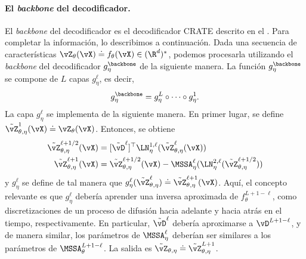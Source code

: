 \documentclass[../../book-main_es.tex]{subfiles}
\begin{document}
\paragraph{El \textit{backbone} del decodificador.} El \textit{backbone} del decodificador es el decodificador CRATE
descrito en el . Para completar la información,
lo describimos a continuación. Dada una secuencia de características \(\vZ_{\theta}(\vX) \doteq
f_{\theta}(\vX) \in (\R^{d})^{*}\), podemos procesarla utilizando el
\textit{backbone} del decodificador \(g_{\eta}^{\backbone}\) de la siguiente manera. La función
\(g_{\eta}^{\backbone}\) se compone de \(L\) capas \(g_{\eta}^{\ell}\), es decir,
\begin{equation}
g_{\eta}^{\backbone} = g_{\eta}^{L} \circ \cdots \circ g_{\eta}^{1}.
\end{equation}
La capa \(g_{\eta}^{\ell}\) se implementa de la siguiente manera.
En primer lugar, se define \(\tilde{\vZ}_{\theta, \eta}^{1}(\vX) \doteq
\vZ_{\theta}(\vX)\). Entonces, se obtiene
\begin{align}
\tilde{\vZ}_{\theta, \eta}^{\ell + 1/2}(\vX)
&= [\tilde{\vD}^{\ell}]^{\top}\LN_{\eta}^{1,
\ell}(\tilde{\vZ}_{\theta, \eta}^{\ell}(\vX)) \\
\tilde{\vZ}_{\theta, \eta}^{\ell + 1}(\vX)
&= \tilde{\vZ}_{\theta, \eta}^{\ell + 1/2}(\vX) -
\MSSA_{\eta}^{\ell}(\LN_{\eta}^{2, \ell}(\tilde{\vZ}_{\theta,
\eta}^{\ell + 1/2}))
\end{align}
y \(g_{\eta}^{\ell}\) se define de tal manera que
\(g_{\eta}^{\ell}(\tilde{\vZ}_{\theta, \eta}^{\ell}) \doteq
\tilde{\vZ}_{\theta, \eta}^{\ell + 1}(\vX)\). Aquí, el concepto relevante
es que \(g_{\eta}^{\ell}\) debería aprender una inversa aproximada
de \(f_{\theta}^{L + 1 - \ell}\), como discretizaciones de un
proceso de difusión hacia adelante y hacia atrás en el tiempo, respectivamente. En
particular, \(\tilde{\vD}^{\ell}\) debería aproximarse a \(\vD^{L + 1 -
\ell}\), y de manera similar, los parámetros de \(\MSSA_{\eta}^{\ell}\) deberían
ser similares a los parámetros de \(\MSSA_{\theta}^{L + 1 - \ell}\).
La salida es \(\tilde{\vZ}_{\theta, \eta} \doteq
\tilde{\vZ}_{\theta, \eta}^{L + 1}\).
\end{document}
